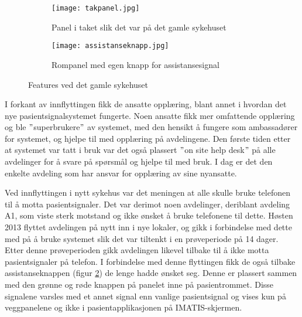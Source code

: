 \begin{figure}[H]
        \centering
        \begin{subfigure}[b]{1.0\textwidth}
        		\centering
                \texttt{[image: takpanel.jpg]}
                \caption{Panel i taket slik det var på det gamle sykehuset}
                \label{takpanel}
        \end{subfigure}
        
        \begin{subfigure}[b]{1.0\textwidth}
        		\centering
                \texttt{[image: assistanseknapp.jpg]}
                \caption{Rompanel med egen knapp for assistansesignal}
                \label{assistanseknapp}
        \end{subfigure}
        \caption{Features ved det gamle sykehuset}
        \label{takass}
\end{figure}


\noindent
I forkant av innflyttingen fikk de ansatte opplæring, blant annet i hvordan det nye pasientsignalsystemet fungerte. Noen ansatte fikk mer omfattende opplæring og ble $"$superbrukere$"$ av systemet, med den hensikt å fungere som ambassadører for systemet, og hjelpe til med opplæring på avdelingene. Den første tiden etter at systemet var tatt i bruk var det også plassert $"$on site help desk$"$ på alle avdelinger for å svare på spørsmål og hjelpe til med bruk. I dag er det den enkelte avdeling som har ansvar for opplæring av sine nyansatte. 

\noindent
Ved innflyttingen i nytt sykehus var det meningen at alle skulle bruke telefonen til å motta pasientsignaler. Det var derimot noen avdelinger, deriblant avdeling A1, som viste sterk motstand og ikke ønsket å bruke telefonene til dette.
Høsten 2013 flyttet avdelingen på nytt inn i nye lokaler, og gikk i forbindelse med dette med på å bruke systemet slik det var tiltenkt i en prøveperiode på 14 dager. Etter denne prøveperioden gikk avdelingen likevel tilbake til å ikke motta pasientsignaler på telefon. 
I forbindelse med denne flyttingen fikk de også tilbake assistanseknappen (figur \ref{assistanseknapp}) de lenge hadde ønsket seg. Denne er plassert sammen med den grønne og røde knappen på panelet inne på pasientrommet. Disse signalene varsles med et annet signal enn vanlige pasientsignal og vises kun på veggpanelene og ikke i pasientapplikasjonen på IMATIS-skjermen.